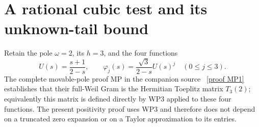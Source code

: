 \documentclass[11pt]{article}
\begin{document}
\section{A rational cubic test and its unknown-tail bound}
Retain the pole $\omega=2$, its $h=3$, and the four functions
\[
 U(s)=\frac{s+1}{2-s},\qquad
 \varphi_j(s)=\frac{\sqrt3}{2-s}U(s)^j\quad(0\le j\le3).
                                                                  \tag{WP17}
\]
The complete movable-pole proof MP in the companion source \cite{MP}%
~\href{https://github.com/KokunoYumeto/zeta-function-research-reader/blob/5992ad50c0f2a06921f1fcaded7b4e38097c0739/workbenches/splitzero-tandem/continuations/20260920-original-kernel-mixed-determinants/providers/MOVABLE_POLE_WEIL_DERIVATION.tex\#L30}{[proof MP1]}%
{}
establishes that their full-Weil Gram is the Hermitian Toeplitz
matrix $T_3(2)$; equivalently this matrix is defined directly by
WP3 applied to these four functions. The present positivity
proof uses WP3 and therefore does not depend on a truncated
zero expansion or on a Taylor approximation to its entries.
\end{document}
